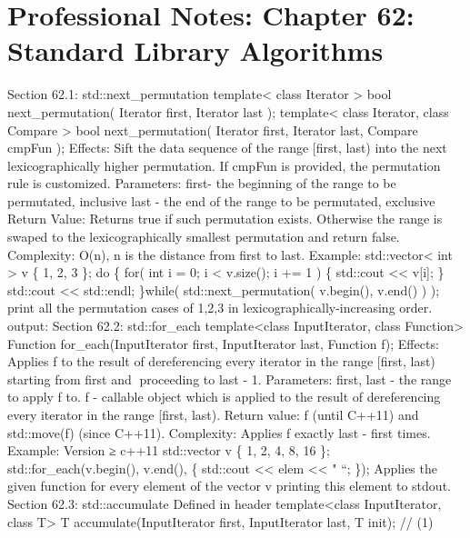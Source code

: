 \hypertarget{professional-notes-chapter-62-standard-library-algorithms-1}{%
\chapter{Professional Notes: Chapter 62: Standard Library
Algorithms}\label{professional-notes-chapter-62-standard-library-algorithms-1}}

Section 62.1: std::next\_permutation template\textless{} class Iterator
\textgreater{} bool next\_permutation( Iterator first, Iterator last );
template\textless{} class Iterator, class Compare \textgreater{} bool
next\_permutation( Iterator first, Iterator last, Compare cmpFun );
Eﬀects: Sift the data sequence of the range {[}ﬁrst, last) into the next
lexicographically higher permutation. If cmpFun is provided, the
permutation rule is customized. Parameters: first- the beginning of the
range to be permutated, inclusive last - the end of the range to be
permutated, exclusive Return Value: Returns true if such permutation
exists. Otherwise the range is swaped to the lexicographically smallest
permutation and return false. Complexity: O(n), n is the distance from
first to last. Example: std::vector\textless{} int \textgreater{} v \{
1, 2, 3 \}; do \{ for( int i = 0; i \textless{} v.size(); i += 1 ) \{
std::cout \textless\textless{} v{[}i{]}; \} std::cout
\textless\textless{} std::endl; \}while( std::next\_permutation(
v.begin(), v.end() ) ); print all the permutation cases of 1,2,3 in
lexicographically-increasing order. output: Section 62.2: std::for\_each
template\textless class InputIterator, class Function\textgreater{}
Function for\_each(InputIterator first, InputIterator last, Function f);
Eﬀects: Applies f to the result of dereferencing every iterator in the
range {[}first, last) starting from first and proceeding to last - 1.
Parameters: first, last - the range to apply f to. f - callable object
which is applied to the result of dereferencing every iterator in the
range {[}first, last). Return value: f (until C++11) and std::move(f)
(since C++11). Complexity: Applies f exactly last - first times.
Example: Version ≥ c++11 std::vector v \{ 1, 2, 4, 8, 16 \};
std::for\_each(v.begin(), v.end(), \href{int\%20elem}{} \{ std::cout
\textless\textless{} elem \textless\textless{} " ``; \}); Applies the
given function for every element of the vector v printing this element
to stdout. Section 62.3: std::accumulate Deﬁned in header
template\textless class InputIterator, class T\textgreater{} T
accumulate(InputIterator first, InputIterator last, T init); // (1)
